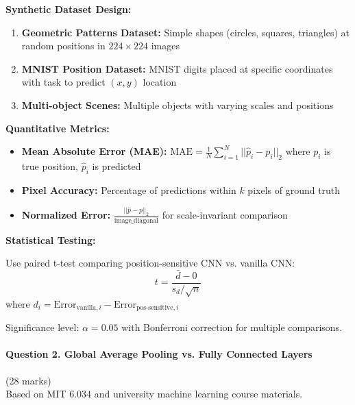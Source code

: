 \documentclass[12pt]{article}
\newcommand{\explanation}[1]{{\color{explanationcolor}#1}}
\begin{document}
\begin{enumerate}[(a)]
    \explanation{
    \textbf{Synthetic Dataset Design:}
    
    \begin{enumerate}
        \item \textbf{Geometric Patterns Dataset:} Simple shapes (circles, squares, triangles) at random positions in $224 \times 224$ images
        \item \textbf{MNIST Position Dataset:} MNIST digits placed at specific coordinates with task to predict $(x,y)$ location
        \item \textbf{Multi-object Scenes:} Multiple objects with varying scales and positions
    \end{enumerate}
    
    \textbf{Quantitative Metrics:}
    
    \begin{itemize}
        \item \textbf{Mean Absolute Error (MAE):} $\text{MAE} = \frac{1}{N}\sum_{i=1}^N ||\hat{p}_i - p_i||_2$ where $p_i$ is true position, $\hat{p}_i$ is predicted
        \item \textbf{Pixel Accuracy:} Percentage of predictions within $k$ pixels of ground truth
        \item \textbf{Normalized Error:} $\frac{||\hat{p} - p||_2}{\text{image\_diagonal}}$ for scale-invariant comparison
    \end{itemize}
    
    \textbf{Statistical Testing:}
    
    Use paired t-test comparing position-sensitive CNN vs. vanilla CNN:
    $$t = \frac{\bar{d} - 0}{s_d/\sqrt{n}}$$
    where $d_i = \text{Error}_{\text{vanilla},i} - \text{Error}_{\text{pos-sensitive},i}$
    
    Significance level: $\alpha = 0.05$ with Bonferroni correction for multiple comparisons.
    }
\end{enumerate}

\newpage
\paragraph{Question 2. Global Average Pooling vs. Fully Connected Layers}{{\hfill (28 marks)}}\\
Based on MIT 6.034 and university machine learning course materials.
\end{document}
